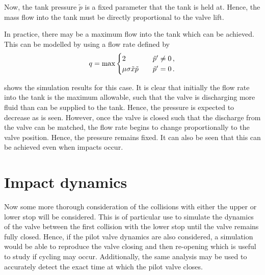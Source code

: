 Now, the tank pressure $\tilde{p}$ is a fixed parameter that the tank is held at. Hence, the mass flow into the tank must be directly proportional to the valve lift.

In practice, there may be a maximum flow into the tank which can be achieved. This can be modelled by using a flow rate defined by
~
\begin{equation*}
    q = \max \begin{cases} 2 & \quad \tilde{p}{'} \neq 0 \, , \\
    \mu \sigma \tilde{x} \tilde{p} & \quad \tilde{p}{'} = 0 \, .
    \end{cases}
\end{equation*}

 shows the simulation results for this case. It is clear that initially the flow rate into the tank is the maximum allowable, such that the valve is discharging more fluid than can be supplied to the tank.  Hence, the pressure is expected to decrease as is seen. However, once the valve is closed such that the discharge from the valve can be matched, the flow rate begins to change proportionally to the valve position. Hence, the pressure remains fixed. It can also be seen that this can be achieved even when impacts occur.

\section{Impact dynamics} \label{sec: ImpactDynamics}

Now some more thorough consideration of the collisions with either the upper or lower stop will be considered. This is of particular use to simulate the dynamics of the valve between the first collision with the lower stop until the valve remains fully closed. Hence, if the pilot valve dynamics are also considered, a simulation would be able to reproduce the valve closing and then re-opening which is useful to study if cycling may occur. Additionally, the same analysis may be used to accurately detect the exact time at which the pilot valve closes.

